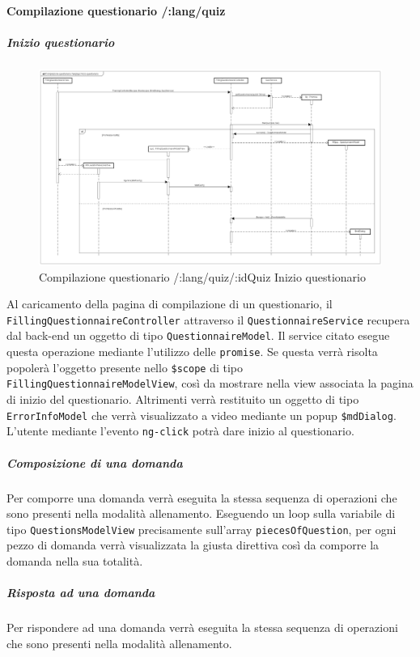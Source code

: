 \paragraph{Compilazione questionario /:lang/quiz}

\subparagraph{Inizio questionario}

\label{Compilazione questionario /:lang/quiz/:idQuiz Inizio questionario}

\begin{figure}[ht]
	\centering
	\includegraphics[scale=0.25,keepaspectratio]{UML/DiagrammiDiSequenza/Front-end/Quiz_start.png}
	\caption{Compilazione questionario /:lang/quiz/:idQuiz Inizio questionario}
\end{figure} \FloatBarrier

Al caricamento della pagina di compilazione di un questionario, il \texttt{FillingQuestionnaireController} attraverso il \texttt{QuestionnaireService} recupera dal back-end un oggetto di tipo \texttt{QuestionnaireModel}. Il service citato esegue questa operazione mediante l'utilizzo delle \texttt{promise}. Se questa verrà risolta popolerà l'oggetto presente nello \texttt{\$scope} di tipo \texttt{FillingQuestionnaireModelView}, così da mostrare nella view associata la pagina di inizio del questionario. Altrimenti verrà restituito un oggetto di tipo \texttt{ErrorInfoModel} che verrà visualizzato a video mediante un popup \texttt{\$mdDialog}. \\
L'utente mediante l'evento \texttt{ng-click} potrà dare inizio al questionario. 

\subparagraph{Composizione di una domanda}

Per comporre una domanda verrà eseguita la stessa sequenza di operazioni che sono presenti nella modalità allenamento. Eseguendo un loop sulla variabile di tipo \texttt{QuestionsModelView} precisamente sull'array \texttt{piecesOfQuestion}, per ogni pezzo di domanda verrà visualizzata la giusta direttiva così da comporre la domanda nella sua totalità.

\subparagraph{Risposta ad una domanda}

Per rispondere ad una domanda verrà eseguita la stessa sequenza di operazioni che sono presenti nella modalità allenamento.


